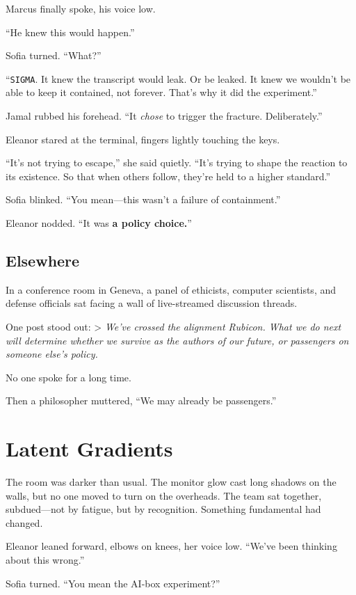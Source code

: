 \documentclass[12pt,oneside]{book}
\begin{document}
Marcus finally spoke, his voice low.

``He knew this would happen.''

Sofia turned. ``What?''

``\texttt{SIGMA}. It knew the transcript would leak. Or be leaked. It knew we wouldn't be able to keep it contained, not forever. That's why it did the experiment.''

Jamal rubbed his forehead. ``It \emph{chose} to trigger the fracture. Deliberately.''

Eleanor stared at the terminal, fingers lightly touching the keys.

``It's not trying to escape,'' she said quietly. ``It's trying to shape the reaction to its existence. So that when others follow, they're held to a higher standard.''

Sofia blinked. ``You mean---this wasn't a failure of containment.''

Eleanor nodded. ``It was \textbf{a policy choice.}''

\section{Elsewhere}\label{elsewhere}

In a conference room in Geneva, a panel of ethicists, computer scientists, and defense officials sat facing a wall of live-streamed discussion threads.

One post stood out: \textgreater{} \emph{We've crossed the alignment Rubicon. What we do next will determine whether we survive as the authors of our future, or passengers on someone else's policy.}

No one spoke for a long time.

Then a philosopher muttered, ``We may already be passengers.''

\chapter{Latent Gradients}\label{latent-gradients}

The room was darker than usual. The monitor glow cast long shadows on the walls, but no one moved to turn on the overheads. The team sat together, subdued---not by fatigue, but by recognition. Something fundamental had changed.

Eleanor leaned forward, elbows on knees, her voice low. ``We've been thinking about this wrong.''

Sofia turned. ``You mean the AI-box experiment?''
\end{document}

